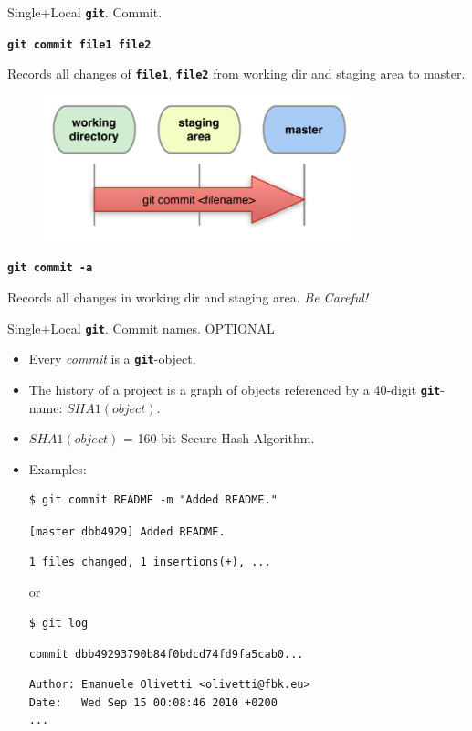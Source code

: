 \documentclass{beamer}
\newcommand{\git}{\texttt{\textbf{git}}\xspace}
\begin{document}
\begin{frame}{Single+Local \git. Commit.}
  \begin{center}
    \texttt{\textbf{git commit file1 file2}}
  \end{center}
  Records all changes of \texttt{\textbf{file1}},
  \texttt{\textbf{file2}} from working dir and staging area to master.
  \begin{figure}
    \centering
    \includegraphics[width=9cm]{figs/local-commit-filename}
  \end{figure}
  \begin{center}
    \texttt{\textbf{git commit -a}}
  \end{center}
  Records all changes in working dir and staging area. \emph{Be Careful!}
\end{frame}

\begin{frame}[containsverbatim]{Single+Local \git. Commit names. \alert{OPTIONAL}}
  \begin{itemize}
  \item Every \emph{commit} is a \git-object.
  \item The history of a project is a graph of objects referenced by a
    40-digit \git-name: $SHA1(object)$.
  \item $SHA1(object)$ = 160-bit Secure Hash Algorithm.
  \item Examples:
\begin{verbatim}
$ git commit README -m "Added README."
\end{verbatim}
\texttt{[master \alert{dbb4929}] Added README.}
\begin{verbatim}
1 files changed, 1 insertions(+), ...
\end{verbatim}
or
\begin{verbatim}
$ git log
\end{verbatim}
\texttt{commit \alert{dbb49293790b84f0bdcd74fd9fa5cab0...}}
\begin{verbatim}
Author: Emanuele Olivetti <olivetti@fbk.eu>
Date:   Wed Sep 15 00:08:46 2010 +0200
...
\end{verbatim}
  \end{itemize}
\end{frame}
\end{document}
